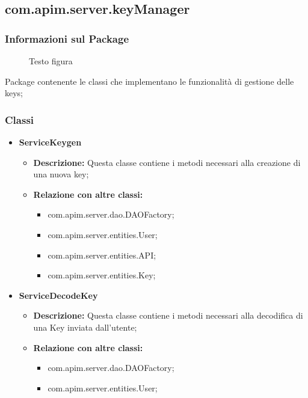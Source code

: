 {{    \subsection{com.apim.server.keyManager}{
    \subsubsection{Informazioni sul Package}
        \begin{figure}[ht]
          \centering
          \caption{Testo figura}
          \label{Testo figura}
        \end{figure}
        Package contenente le classi che implementano le funzionalità di gestione delle keys;
        \subsubsection{Classi}
        \begin{itemize} \itemsep1pt
          \item \textbf{ServiceKeygen}
          \begin{itemize}
            \item \textbf{Descrizione:} Questa classe contiene i metodi necessari alla creazione di una nuova key;
            \item \textbf{Relazione con altre classi:}
            \begin{itemize}
            \item com.apim.server.dao.DAOFactory;
            \item com.apim.server.entities.User;
            \item com.apim.server.entities.API;
            \item com.apim.server.entities.Key;
            \end{itemize}
          \end{itemize}
          \item \textbf{ServiceDecodeKey}
          \begin{itemize}
            \item \textbf{Descrizione:} Questa classe contiene i metodi necessari alla decodifica di una Key inviata dall'utente;
            \item \textbf{Relazione con altre classi:}
            \begin{itemize}
            \item com.apim.server.dao.DAOFactory;
            \item com.apim.server.entities.User;

\end{itemize}
\end{itemize}
\end{itemize}}}}
